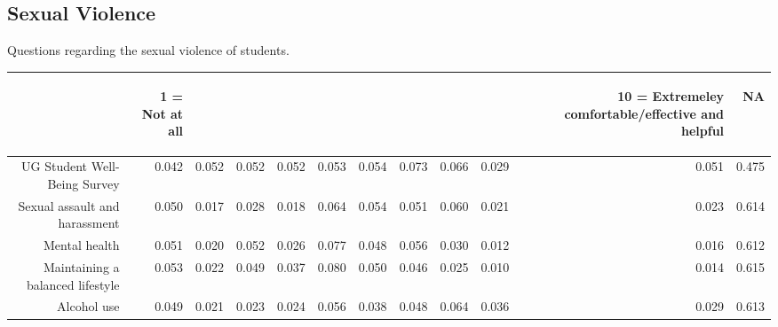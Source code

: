 \documentclass{article}\usepackage[]{graphicx}\usepackage[]{color}
\makeatletter
\newenvironment{kframe}{%
 \def\at@end@of@kframe{}%
 \ifinner\ifhmode%
  \def\at@end@of@kframe{\end{minipage}}%
  \begin{minipage}{\columnwidth}%
 \fi\fi%
 \def\FrameCommand##1{\hskip\@totalleftmargin \hskip-\fboxsep
 \colorbox{shadecolor}{##1}\hskip-\fboxsep
     \hskip-\linewidth \hskip-\@totalleftmargin \hskip\columnwidth}%
 \MakeFramed {\advance\hsize-\width
   \@totalleftmargin\z@ \linewidth\hsize
   \@setminipage}}%
 {\par\unskip\endMakeFramed%
 \at@end@of@kframe}
\makeatother
\begin{document}
\newpage
\subsection{Sexual Violence}
Questions regarding the sexual violence of students.
\begin{kframe}


{\ttfamily\noindent\bfseries{}}\end{kframe}%
\begin{table}[ht]
\centering
\begin{tabular}{rrrrrrrrrrrr}
  \hline
 & \begin{sideways} 1 = Not at all \end{sideways} & \begin{sideways}   \end{sideways} & \begin{sideways}   \end{sideways} & \begin{sideways}   \end{sideways} & \begin{sideways}   \end{sideways} & \begin{sideways}   \end{sideways} & \begin{sideways}   \end{sideways} & \begin{sideways}   \end{sideways} & \begin{sideways}   \end{sideways} & \begin{sideways} 10 = Extremeley comfortable/effective and helpful \end{sideways} & \begin{sideways} NA \end{sideways} \\ 
  \hline
UG Student Well-Being Survey & 0.042 & 0.052 & 0.052 & 0.052 & 0.053 & 0.054 & 0.073 & 0.066 & 0.029 & 0.051 & 0.475 \\ 
  Sexual assault and harassment & 0.050 & 0.017 & 0.028 & 0.018 & 0.064 & 0.054 & 0.051 & 0.060 & 0.021 & 0.023 & 0.614 \\ 
  Mental health & 0.051 & 0.020 & 0.052 & 0.026 & 0.077 & 0.048 & 0.056 & 0.030 & 0.012 & 0.016 & 0.612 \\ 
  Maintaining a balanced lifestyle & 0.053 & 0.022 & 0.049 & 0.037 & 0.080 & 0.050 & 0.046 & 0.025 & 0.010 & 0.014 & 0.615 \\ 
  Alcohol use & 0.049 & 0.021 & 0.023 & 0.024 & 0.056 & 0.038 & 0.048 & 0.064 & 0.036 & 0.029 & 0.613 \\ 
   \hline
\end{tabular}
\end{table}
\end{document}
